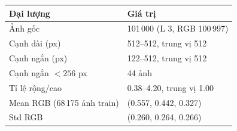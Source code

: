 \begin{tabular}{ll}
\toprule
Đại lượng & Giá trị \\
\midrule
Ảnh gốc & 101\,000 (L 3, RGB 100\,997) \\
Cạnh dài (px) & 512--512, trung vị 512 \\
Cạnh ngắn (px) & 122--512, trung vị 512 \\
Cạnh ngắn \(<256\) px & 44 ảnh \\
Tỉ lệ rộng/cao & 0.38--4.20, trung vị 1.00 \\
Mean RGB (68\,175 ảnh train) & (0.557, 0.442, 0.327) \\
Std RGB & (0.260, 0.264, 0.266) \\
\bottomrule
\end{tabular}
